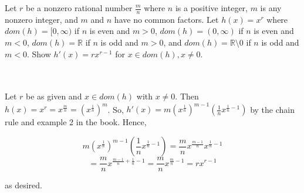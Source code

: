 Let $r$ be a nonzero rational number $\frac{m}{n}$ where $n$ is a positive integer, $m$ is any nonzero
integer, and $m$ and $n$ have no common factors. Let $h(x)=x^r$ where $dom(h)=[0,\infty)$ if $n$ is even
and $m>0$, $dom(h)=(0,\infty)$ if $n$ is even and $m<0$, $dom(h)=\mathbb{R}$ if $n$ is odd and $m>0$,
and $dom(h)=\mathbb{R}\setminus{0}$ if $n$ is odd and $m<0$. Show $h'(x) = rx^{r-1}$ for
$x\in dom(h), x\neq0$.\\\\

\begin{solution}\renewcommand{\qedsymbol}{}\ \\
    Let $r$ be as given and $x\in dom(h)$ with $x\neq0$. Then
    $h(x)=x^r=x^{\frac{m}{n}}=(x^{\frac1n})^m$. So, $h'(x)=m(x^{\frac1n})^{m-1}(\frac1nx^{\frac1n-1})$
    by the chain rule and example 2 in the book. Hence,
    
    $$m(x^{\frac1n})^{m-1}(\frac1nx^{\frac1n-1})=\frac{m}{n}x^{\frac{m-1}{n}}x^{\frac1n-1}$$
    $$=\frac{m}{n}x^{\frac{m-1}{n}+\frac1n-1}=\frac{m}{n}x^{\frac{m}{n}-1}=rx^{r-1}$$
    
    as desired.

\end{solution}